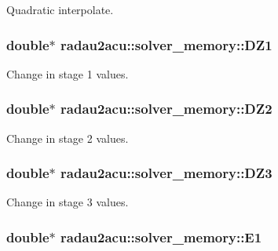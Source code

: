 Quadratic interpolate. 

\subsubsection[{\texorpdfstring{D\+Z1}{DZ1}}]{\setlength{\rightskip}{0pt plus 5cm}double$\ast$ radau2acu\+::solver\+\_\+memory\+::\+D\+Z1}\hypertarget{structradau2acu_1_1solver__memory_a78015c06e296e68bcf33d8a0d426274b}{}\label{structradau2acu_1_1solver__memory_a78015c06e296e68bcf33d8a0d426274b}


Change in stage 1 values. 

\subsubsection[{\texorpdfstring{D\+Z2}{DZ2}}]{\setlength{\rightskip}{0pt plus 5cm}double$\ast$ radau2acu\+::solver\+\_\+memory\+::\+D\+Z2}\hypertarget{structradau2acu_1_1solver__memory_a61abfb203c0d4cdc85f74f380228ad8a}{}\label{structradau2acu_1_1solver__memory_a61abfb203c0d4cdc85f74f380228ad8a}


Change in stage 2 values. 

\subsubsection[{\texorpdfstring{D\+Z3}{DZ3}}]{\setlength{\rightskip}{0pt plus 5cm}double$\ast$ radau2acu\+::solver\+\_\+memory\+::\+D\+Z3}\hypertarget{structradau2acu_1_1solver__memory_a6295db592933b6a3260b8aa11f1720d3}{}\label{structradau2acu_1_1solver__memory_a6295db592933b6a3260b8aa11f1720d3}


Change in stage 3 values. 

\subsubsection[{\texorpdfstring{E1}{E1}}]{\setlength{\rightskip}{0pt plus 5cm}double$\ast$ radau2acu\+::solver\+\_\+memory\+::\+E1}\hypertarget{structradau2acu_1_1solver__memory_aeb9205a7ae71b2356f6e65a65674f210}{}\label{structradau2acu_1_1solver__memory_aeb9205a7ae71b2356f6e65a65674f210}



